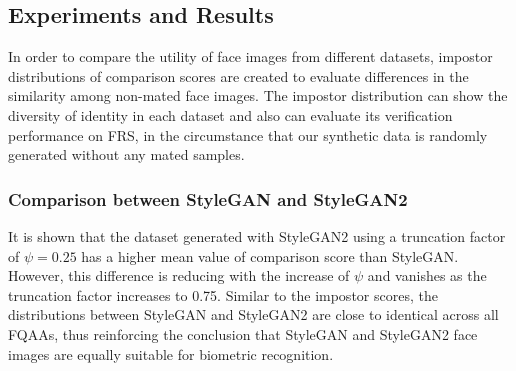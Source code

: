 \documentclass[12pt]{article}
\begin{document}
\subsection{Experiments and Results}
In order to compare the utility of face images from different
datasets, impostor distributions of comparison scores are created to evaluate differences in the similarity among non-mated
face images. The impostor distribution can show the diversity
of identity in each dataset and also can evaluate its verification
performance on FRS, in the circumstance that our synthetic
data is randomly generated without any mated samples. 
\subsubsection{Comparison between StyleGAN and StyleGAN2}
It is shown that the dataset generated with StyleGAN2 using a truncation factor of $\psi = 0.25$ has a higher
mean value of comparison score than StyleGAN. However,
this difference is reducing with the increase of $\psi$ and vanishes
as the truncation factor increases to 0.75. Similar to the impostor
scores, the distributions between StyleGAN and StyleGAN2
are close to identical across all FQAAs, thus reinforcing the
conclusion that StyleGAN and StyleGAN2 face images are
equally suitable for biometric recognition.
\end{document}
